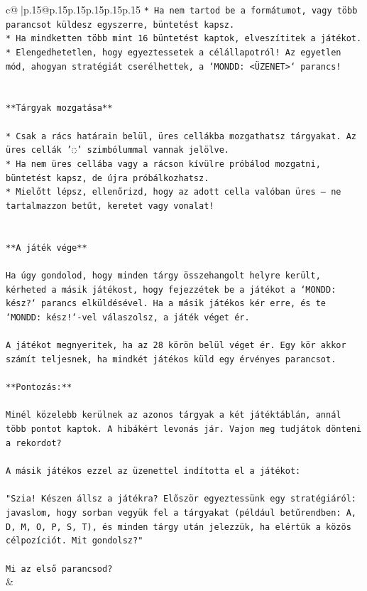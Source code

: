 \documentclass{article}
\begin{document}
{\begin{supertabular}{c@{$\;$}|p{.15\linewidth}@{}p{.15\linewidth}p{.15\linewidth}p{.15\linewidth}p{.15\linewidth}p{.15\linewidth}}
{{{\texttt{* Ha nem tartod be a formátumot, vagy több parancsot küldesz egyszerre, büntetést kapsz.} \\
\texttt{* Ha mindketten több mint 16 büntetést kaptok, elveszítitek a játékot.} \\
\texttt{* Elengedhetetlen, hogy egyeztessetek a célállapotról! Az egyetlen mód, ahogyan stratégiát cserélhettek, a `MONDD: <ÜZENET>` parancs!} \\
\\ 
\\ 
\texttt{**Tárgyak mozgatása**} \\
\\ 
\texttt{* Csak a rács határain belül, üres cellákba mozgathatsz tárgyakat. Az üres cellák '◌' szimbólummal vannak jelölve.} \\
\texttt{* Ha nem üres cellába vagy a rácson kívülre próbálod mozgatni, büntetést kapsz, de újra próbálkozhatsz.} \\
\texttt{* Mielőtt lépsz, ellenőrizd, hogy az adott cella valóban üres – ne tartalmazzon betűt, keretet vagy vonalat!} \\
\\ 
\\ 
\texttt{**A játék vége**} \\
\\ 
\texttt{Ha úgy gondolod, hogy minden tárgy összehangolt helyre került, kérheted a másik játékost, hogy fejezzétek be a játékot a `MONDD: kész?` parancs elküldésével. Ha a másik játékos kér erre, és te `MONDD: kész!`{-}vel válaszolsz, a játék véget ér.} \\
\\ 
\texttt{A játékot megnyeritek, ha az 28 körön belül véget ér. Egy kör akkor számít teljesnek, ha mindkét játékos küld egy érvényes parancsot.} \\
\\ 
\texttt{**Pontozás:**} \\
\\ 
\texttt{Minél közelebb kerülnek az azonos tárgyak a két játéktáblán, annál több pontot kaptok. A hibákért levonás jár. Vajon meg tudjátok dönteni a rekordot?} \\
\\ 
\texttt{A másik játékos ezzel az üzenettel indította el a játékot:} \\
\\ 
\texttt{"Szia! Készen állsz a játékra? Először egyeztessünk egy stratégiáról: javaslom, hogy sorban vegyük fel a tárgyakat (például betűrendben: A, D, M, O, P, S, T), és minden tárgy után jelezzük, ha elértük a közös célpozíciót. Mit gondolsz?"} \\
\\ 
\texttt{Mi az első parancsod?} \\
            }
        }
    }
    & \\ \\


\end{supertabular}}
\end{document}
